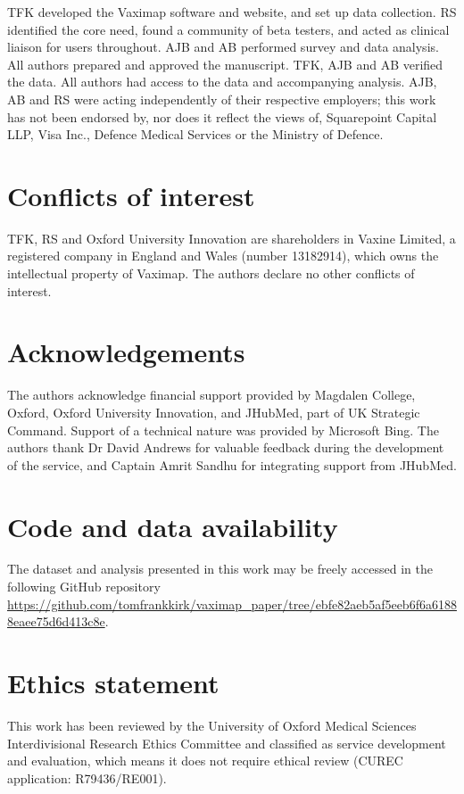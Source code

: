 \documentclass{article}
\def\vm{Vaximap}
\begin{document}
TFK developed the \vm{} software and website, and set up data collection. RS identified the core need, found a community of beta testers, and acted as clinical liaison for users throughout. AJB and AB performed survey and data analysis. All authors prepared and approved the manuscript. TFK, AJB and AB verified the data. All authors had access to the data and accompanying analysis. AJB, AB and RS were acting independently of their respective employers; this work has not been endorsed by, nor does it reflect the views of, Squarepoint Capital LLP, Visa Inc., Defence Medical Services or the Ministry of Defence. 

\section{Conflicts of interest}

TFK, RS and Oxford University Innovation are shareholders in Vaxine Limited, a registered company in England and Wales (number 13182914), which owns the intellectual property of \vm{}. The authors declare no other conflicts of interest. 

\section{Acknowledgements}

The authors acknowledge financial support provided by Magdalen College, Oxford, Oxford University Innovation, and JHubMed, part of UK Strategic Command. Support of a technical nature was provided by Microsoft Bing. The authors thank Dr David Andrews for valuable feedback during the development of the service, and Captain Amrit Sandhu for integrating support from JHubMed. 

\section{Code and data availability}

The dataset and analysis presented in this work may be freely accessed in the following GitHub repository \url{https://github.com/tomfrankkirk/vaximap_paper/tree/ebfe82aeb5af5eeb6f6a61888eaee75d6d413c8e}. 

\section{Ethics statement}

This work has been reviewed by the University of Oxford Medical Sciences Interdivisional Research Ethics Committee and classified as service development and evaluation, which means it does not require ethical review (CUREC application: R79436/RE001). 


\begingroup
\sloppy
\printbibliography
\endgroup
\end{document}
